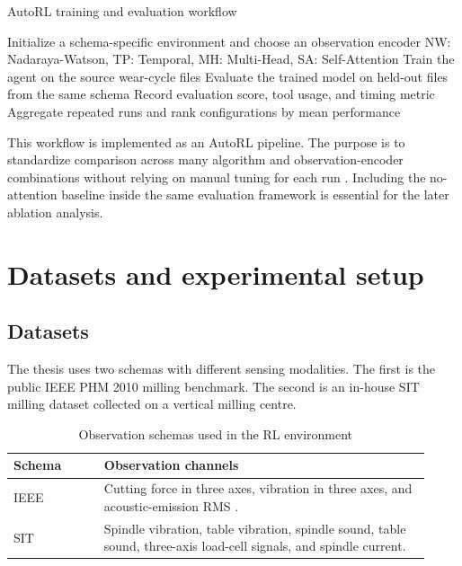 \documentclass[12pt,oneside]{book}
\begin{document}
\begin{algorithm}[htbp]
\caption{AutoRL training and evaluation workflow}
\label{alg:autorl-workflow}
\begin{algorithmic}[1]
\State Initialize a schema-specific environment and choose an observation encoder
\State \quad NW: Nadaraya-Watson, TP: Temporal,
\State \quad MH: Multi-Head, SA: Self-Attention
\State Train the agent on the source wear-cycle files
\State Evaluate the trained model on held-out files from the same schema
\State Record evaluation score, tool usage, and timing metric
\EndFor
\EndFor
\EndFor
\State Aggregate repeated runs and rank configurations by mean performance
\end{algorithmic}
\end{algorithm}

This workflow is implemented as an AutoRL pipeline. The purpose is to standardize comparison across many algorithm and observation-encoder combinations without relying on manual tuning for each run \cite{Shala2022AutoRL, Eimer2023, Henderson2019}. Including the no-attention baseline inside the same evaluation framework is essential for the later ablation analysis.

\section{Datasets and experimental setup}
\subsection{Datasets}
The thesis uses two schemas with different sensing modalities. The first is the public IEEE PHM 2010 milling benchmark. The second is an in-house SIT milling dataset collected on a vertical milling centre.

\begin{table}[htbp]
\centering
\caption{Observation schemas used in the RL environment}
\label{tab:schemas}
\begin{tabular}{L{0.20\linewidth} L{0.72\linewidth}}
\toprule
\textbf{Schema} & \textbf{Observation channels} \\
\midrule
IEEE & Cutting force in three axes, vibration in three axes, and acoustic-emission RMS \cite{PHMdata2010}. \\
SIT & Spindle vibration, table vibration, spindle sound, table sound, three-axis load-cell signals, and spindle current. \\
\bottomrule
\end{tabular}
\end{table}
\end{document}
